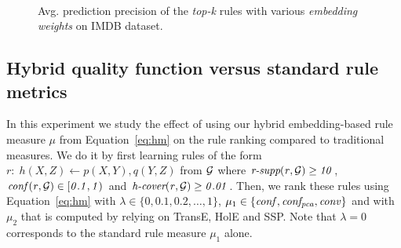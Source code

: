 \begin{figure}[t]
     \centering
     \\
     \caption{Avg. prediction precision of the \textit{top-k} rules with various \textit{embedding weights} on IMDB dataset.}
     \label{fig:appendix_exp1_imdb}
\end{figure}
\subsection{Hybrid quality function versus standard rule metrics} \label{exp:1}
In this experiment we study the effect of using our hybrid embedding-based 
rule measure $\mu$ from Equation~\ref{eq:hm} on the 
rule ranking compared to traditional measures. 
We do it by first 
learning rules of the form $r:\;h(X,Z) \leftarrow p(X,Y), q(Y,Z)$ from $\mathcal{G}$ where $\mathit{\textit{r-supp}(r,\mathcal{G})\geq 10}$, $\mathit{conf(r,\mathcal{G})\in [0.1,1)}$ and $\mathit{\textit{h-cover}(r,\mathcal{G})\geq 0.01}$. %
Then, we rank these rules using Equation~\ref{eq:hm} with $\lambda\in \{0, 0.1, 0.2, \dotsc, 1\}$, $\mu_1\in \{\mathit{conf,conf_{pca}, conv}\}$ and with $\mu_2$ that is computed by relying on TransE, HolE and SSP.
Note that $\lambda=0$ corresponds to the standard rule measure $\mu_1$ alone.

